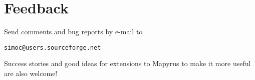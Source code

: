 \section{Feedback}

Send comments and bug reports by e-mail to
\begin{alltt}
simoc@users.sourceforge.net
\end{alltt}

Success stories
and good ideas for extensions to Mapyrus to make it more useful
are also welcome!

